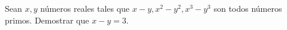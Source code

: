 Sean $x, y$ números reales tales que $x-y, x^2-y^2, x^3-y^3$ son todos números primos. Demostrar que $x-y=3$. \\\\
